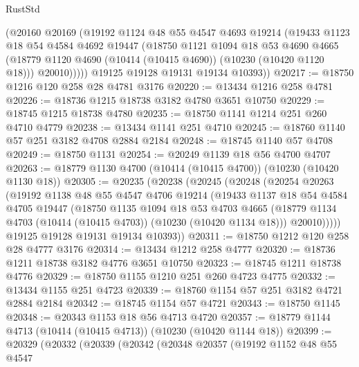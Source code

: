 \begin{lexlean}{RustStd}
\begin{coremodule}
          (@20160
            @20169
            (@19192
              @1124
              @48
              @55
              @4547
              @4693
              @19214
              (@19433
                @1123
                @18
                @54
                @4584
                @4692
                @19447
                (@18750
                  @1121
                  @1094
                  @18
                  @53
                  @4690
                  @4665
                  (@18779 @1120 @4690 (@10414 (@10415 @4690)) (@10230 (@10420 @1120 @18)))
                  @20010)))))
        @19125
        @19128
        @19131
        @19134
        @10393))
@20217 := @18750 @1216 @120 @258 @28 @4781 @3176
@20220 := @13434 @1216 @258 @4781
@20226 := @18736 @1215 @18738 @3182 @4780 @3651 @10750
@20229 := @18745 @1215 @18738 @4780
@20235 := @18750 @1141 @1214 @251 @260 @4710 @4779
@20238 := @13434 @1141 @251 @4710
@20245 := @18760 @1140 @57 @251 @3182 @4708 @2884 @2184
@20248 := @18745 @1140 @57 @4708
@20249 := @18750 @1131
@20254 := @20249 @1139 @18 @56 @4700 @4707
@20263 := @18779 @1130 @4700 (@10414 (@10415 @4700)) (@10230 (@10420 @1130 @18))
@20305 := @20235
    (@20238
      (@20245
        (@20248
          (@20254
            @20263
            (@19192
              @1138
              @48
              @55
              @4547
              @4706
              @19214
              (@19433
                @1137
                @18
                @54
                @4584
                @4705
                @19447
                (@18750
                  @1135
                  @1094
                  @18
                  @53
                  @4703
                  @4665
                  (@18779 @1134 @4703 (@10414 (@10415 @4703)) (@10230 (@10420 @1134 @18)))
                  @20010)))))
        @19125
        @19128
        @19131
        @19134
        @10393))
@20311 := @18750 @1212 @120 @258 @28 @4777 @3176
@20314 := @13434 @1212 @258 @4777
@20320 := @18736 @1211 @18738 @3182 @4776 @3651 @10750
@20323 := @18745 @1211 @18738 @4776
@20329 := @18750 @1155 @1210 @251 @260 @4723 @4775
@20332 := @13434 @1155 @251 @4723
@20339 := @18760 @1154 @57 @251 @3182 @4721 @2884 @2184
@20342 := @18745 @1154 @57 @4721
@20343 := @18750 @1145
@20348 := @20343 @1153 @18 @56 @4713 @4720
@20357 := @18779 @1144 @4713 (@10414 (@10415 @4713)) (@10230 (@10420 @1144 @18))
@20399 := @20329
    (@20332
      (@20339
        (@20342
          (@20348
            @20357
            (@19192
              @1152
              @48
              @55
              @4547

\end{coremodule}
\end{lexlean}

